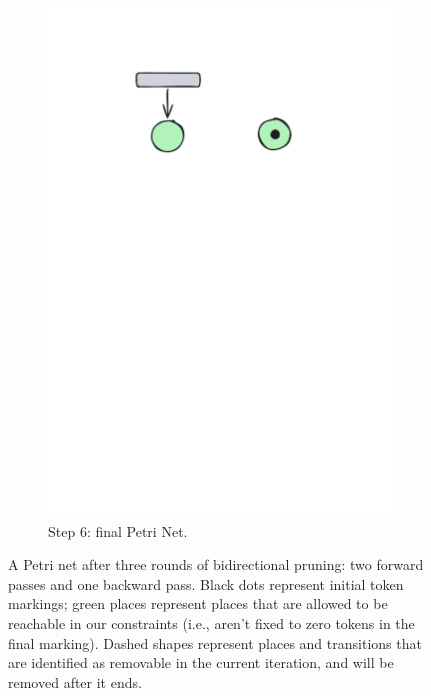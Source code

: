 \begin{figure}[!htbp]
\begin{subfigure}[b][\subfigheight][b]{0.23\textwidth}
		\includegraphics[width=\textwidth]{plots/bidirectional_pruning_step_e_updated_2.pdf}
		\caption{Step 6: final Petri Net.}
		\label{fig:step:e}
	\end{subfigure}
	
	\caption{A Petri net after three rounds of bidirectional pruning: two forward passes and one backward pass. Black dots represent initial token markings; green places represent places that are allowed to be reachable in our constraints (i.e., aren't fixed to zero tokens in the final marking). Dashed shapes represent places and transitions that are identified as removable in the current iteration, and will be removed after it ends.}
	\label{fig:bidirectional_pruning}
\end{figure}

